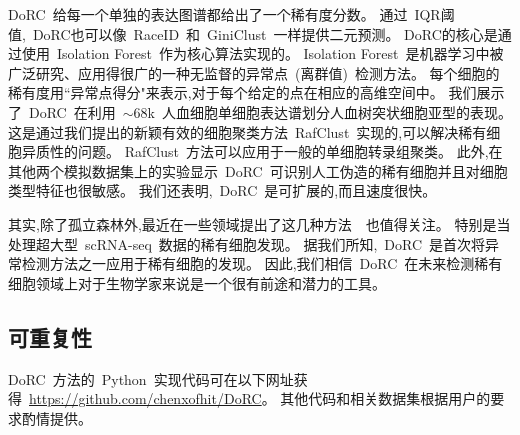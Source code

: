DoRC~给每一个单独的表达图谱都给出了一个稀有度分数。
通过~IQR阈值,~DoRC也可以像~RaceID~和~GiniClust~一样提供二元预测。
DoRC的核心是通过使用~Isolation Forest~作为核心算法实现的。
Isolation Forest~是机器学习中被广泛研究、应用得很广的一种无监督的异常点~(离群值)~检测方法。
每个细胞的稀有度用``异常点得分"来表示,对于每个给定的点在相应的高维空间中。
我们展示了~DoRC~在利用~${\sim}68$k~人血细胞单细胞表达谱划分人血树突状细胞亚型的表现。
这是通过我们提出的新颖有效的细胞聚类方法~RafClust~实现的,可以解决稀有细胞异质性的问题。
RafClust~方法可以应用于一般的单细胞转录组聚类。
此外,在其他两个模拟数据集上的实验显示~DoRC~可识别人工伪造的稀有细胞并且对细胞类型特征也很敏感。
我们还表明,~DoRC~是可扩展的,而且速度很快。

其实,除了孤立森林外,最近在一些领域提出了这几种方法~\cite{aggarwal2015theoretical,zhao2019pyod,liu2019generative,weng2019multi}~也值得关注。
特别是当处理超大型~scRNA-seq~数据的稀有细胞发现。
据我们所知,~DoRC~是首次将异常检测方法之一应用于稀有细胞的发现。
因此,我们相信~DoRC~在未来检测稀有细胞领域上对于生物学家来说是一个很有前途和潜力的工具。

\subsection{可重复性}
DoRC~方法的~Python~实现代码可在以下网址获得~\url{https://github.com/chenxofhit/DoRC}。
其他代码和相关数据集根据用户的要求酌情提供。

